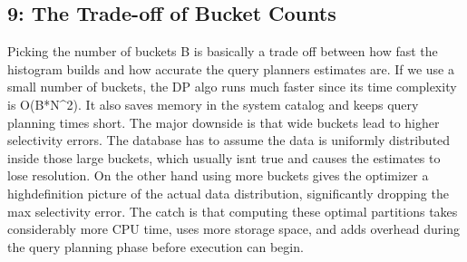 \documentclass[11pt,a4paper]{article}
\begin{document}
\subsection{9: The Trade-off of Bucket Counts}
Picking the number of buckets B is basically a trade off between how fast the histogram builds and how accurate the query planners estimates are.  If we use a small number of buckets, the DP algo runs much faster since its time complexity is O(B*N\textasciicircum{}2). It also saves memory in the system catalog and keeps query planning times short. The major downside is that wide buckets lead to higher selectivity errors. The database has to assume the data is uniformly distributed inside those large buckets, which usually isnt true and causes the estimates to lose resolution.  On the other hand using more buckets gives the optimizer a highdefinition picture of the actual data distribution, significantly dropping the max selectivity error. The catch is that computing these optimal partitions takes considerably more CPU time, uses more storage space, and adds overhead during the query planning phase before execution can begin.
\end{document}
